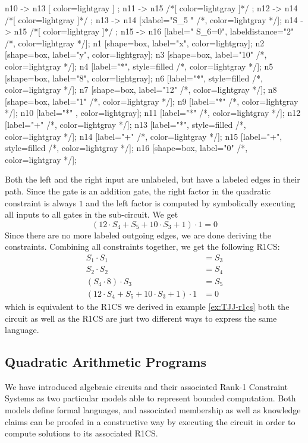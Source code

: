 \begin{example}
\begin{center}
{	n10 -> n13 [ color=lightgray ] ; 
	n11 -> n15 /*[ color=lightgray ]*/ ;
	n12 -> n14 /*[ color=lightgray ]*/ ;	
	n13 -> n14 [xlabel="S_5  "  /*, color=lightgray */];
	n14 -> n15 /*[ color=lightgray ]*/ ;
	n15 -> n16 [label="  S_6=0", labeldistance="2" /*, color=lightgray */];
	n1 [shape=box, label="x", color=lightgray];
	n2 [shape=box, label="y", color=lightgray];
	n3 [shape=box, label="10" /*, color=lightgray */];
	n4 [label="*", style=filled /*, color=lightgray */];
	n5 [shape=box, label="8", color=lightgray];
	n6 [label="*", style=filled /*, color=lightgray */];
	n7 [shape=box, label="12" /*, color=lightgray */];
	n8 [shape=box, label="1" /*, color=lightgray */];
	n9 [label="*" /*, color=lightgray */];
	n10 [label="*" , color=lightgray];
	n11 [label="*" /*, color=lightgray */];	
	n12 [label="+" /*, color=lightgray */];	
	n13 [label="*", style=filled /*, color=lightgray */];
	n14 [label="+" /*, color=lightgray */];
	n15 [label="+", style=filled /*, color=lightgray */];
	n16 [shape=box, label="0" /*, color=lightgray */];		
}
\end{center}
Both the left and the right input are  unlabeled, but have a labeled edges in their path. Since the gate is an addition gate, the right factor in the quadratic constraint is always $1$ and the left factor is computed by symbolically executing all inputs to all gates in the sub-circuit. We get
$$
(12\cdot S_4 + S_5 + 10\cdot S_3 + 1)\cdot 1 = 0
$$
Since there are no more labeled outgoing edges, we are done deriving the constraints. Combining all constraints together, we get the following R1CS:
\begin{align*}
 S_1 \cdot S_1 &= S_3\\
 S_2 \cdot S_2 &= S_4\\
 (S_4\cdot 8)\cdot S_3 &= S_5\\
 (12\cdot S_4 + S_5 + 10\cdot S_3 + 1)\cdot 1 &= 0
\end{align*}
which is equivalent to the R1CS we derived in example \ref{ex:TJJ-r1cs} both the circuit as well as the R1CS are just two different ways to express the same language.
\end{example}
\subsection{Quadratic Arithmetic Programs}
\label{sec:QAP}
 We have introduced algebraic circuits and their associated Rank-1 Constraint Systems as two particular models able to represent bounded computation. Both models define formal languages, and associated membership as well as knowledge claims can be proofed in a constructive way by executing the circuit in order to compute solutions to its associated R1CS. 

